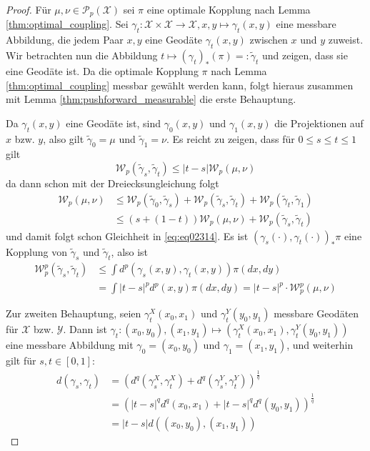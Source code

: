 \begin{proof}
    Für $\mu, \nu \in \mathcal{P}_p(\mathcal{X})$ sei $\pi$ eine optimale Kopplung nach Lemma \ref{thm:optimal_coupling}. Sei $\gamma_t: \mathcal{X}\times \mathcal{X} \rightarrow \mathcal{X}, x,y \mapsto \gamma_t(x,y)$ eine messbare Abbildung, die jedem Paar $x,y$ eine Geodäte $\gamma_t(x,y)$ zwischen $x$ und $y$ zuweist. Wir betrachten nun die Abbildung $t \mapsto (\gamma_{t})_*(\pi)=:\tilde{\gamma}_t$ und zeigen, dass sie eine Geodäte ist. Da die optimale Kopplung $\pi$ nach Lemma \ref{thm:optimal_coupling} messbar gewählt werden kann, folgt hieraus zusammen mit Lemma \ref{thm:pushforward_measurable} die erste Behauptung. 

    Da $\gamma_t(x,y)$ eine Geodäte ist, sind $\gamma_0(x,y)$ und $\gamma_1(x,y)$ die Projektionen auf $x$ bzw. $y$, also gilt $\tilde{\gamma}_0=\mu$ und $\tilde{\gamma}_1=\nu$. Es reicht zu zeigen, dass für $0\leq s\leq t\leq 1$ gilt
    \begin{equation}\label{eq:eq02314}
        \mathcal{W}_p(\tilde{\gamma}_s, \tilde{\gamma}_t) \leq |t-s|\mathcal{W}_p(\mu, \nu)
    \end{equation}
    da dann schon mit der Dreiecksungleichung folgt
    \begin{equation}\label{eq:eq_arg_geod}
        \begin{split}
            \mathcal{W}_p(\mu, \nu) &\leq \mathcal{W}_p(\tilde{\gamma}_0, \tilde{\gamma}_s) + \mathcal{W}_p(\tilde{\gamma}_s, \tilde{\gamma}_t) + \mathcal{W}_p(\tilde{\gamma}_t, \tilde{\gamma}_1) \\
            &\leq (s + (1-t))\mathcal{W}_p(\mu, \nu) + \mathcal{W}_p(\tilde{\gamma}_s, \tilde{\gamma}_t)
        \end{split}
    \end{equation}
    und damit folgt schon Gleichheit in \ref{eq:eq02314}. Es ist $(\gamma_s(\cdot), \gamma_t(\cdot))_*\pi$ eine Kopplung von $\tilde{\gamma}_s$ und $\tilde{\gamma}_t$, also ist 
    \begin{align*}
        \mathcal{W}_p^p(\tilde{\gamma}_s, \tilde{\gamma}_t) &\leq \int d^p(\gamma_s(x,y), \gamma_t(x,y)) \pi(dx,dy) \\
        &= \int |t-s|^pd^p(x,y)\pi(dx,dy) = |t-s|^p\cdot\mathcal{W}_p^p(\mu, \nu)
    \end{align*}

    Zur zweiten Behauptung, seien $\gamma^X_t(x_0,x_1)$ und $\gamma^Y_t(y_0,y_1)$ messbare Geodäten für $\mathcal{X}$ bzw. $\mathcal{Y}$. Dann ist $\gamma_t: (x_0, y_0), (x_1, y_1) \mapsto \left(\gamma^X_t(x_0, x_1), \gamma^Y_t(y_0, y_1)\right)$ eine messbare Abbildung mit $\gamma_0=(x_0, y_0)$ und $\gamma_1 = (x_1, y_1)$, und weiterhin gilt für $s,t\in [0,1]$:
    \begin{align*}
        d(\gamma_s, \gamma_t) &= \left(d^q(\gamma^X_s, \gamma^X_t) + d^q(\gamma^Y_s, \gamma^Y_t)\right)^\frac{1}{q} \\
        &= \left(|t-s|^q d^q(x_0, x_1) + |t-s|^q d^q(y_0, y_1)\right)^\frac{1}{q} \\
        &= |t-s| d((x_0, y_0), (x_1, y_1))
    \end{align*}


\end{proof}
